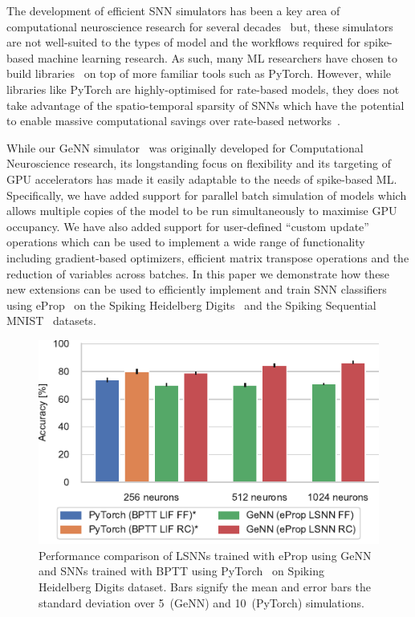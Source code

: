 \documentclass[sigconf,authordraft]{acmart}
\begin{document}
The development of efficient SNN simulators has been a key area of computational neuroscience research for several decades~\citep{carnevale2006neuron, Gewaltig2007, Golosio2021, Akar2019,Yavuz2016} but, these simulators are not well-suited to the types of model and the workflows required for spike-based machine learning research.
As such, many ML researchers have chosen to build libraries~\citep{norse2021, SpikingJelly, eshraghian2021training,Hazan2018} on top of more familiar tools such as PyTorch.
However, while libraries like PyTorch are highly-optimised for rate-based models, they does not take advantage of the spatio-temporal sparsity of SNNs which have the potential to enable massive computational savings over rate-based networks~\citep{Yin2021}.

While our GeNN simulator~\citep{Yavuz2016,Knight2018,Knight2021} was originally developed for Computational Neuroscience research, its longstanding focus on flexibility and its targeting of GPU accelerators has made it easily adaptable to the needs of spike-based ML.
Specifically, we have added support for parallel batch simulation of models which allows multiple copies of the model to be run simultaneously to maximise GPU occupancy.
We have also added support for user-defined ``custom update'' operations which can be used to implement a wide range of functionality including gradient-based optimizers, efficient matrix transpose operations and the reduction of variables across batches.
In this paper we demonstrate how these new extensions can be used to efficiently implement and train SNN classifiers using eProp~\citep{Bellec2020} on the Spiking Heidelberg Digits~\citep{Cramer2020} and the Spiking Sequential MNIST~\citep{Plank2021} datasets.

\begin{figure}[t]
  \centering
  \includegraphics{figures/shd_performance.pdf}
  \caption{Performance comparison of  LSNNs trained with eProp using GeNN and SNNs trained with BPTT using PyTorch~\citep{Zenke2021a} on Spiking Heidelberg Digits dataset.
  Bars signify the mean and error bars the standard deviation over 5~(GeNN) and 10~(PyTorch) simulations.}
  \label{fig:shd_performance}
\end{figure}
\end{document}
